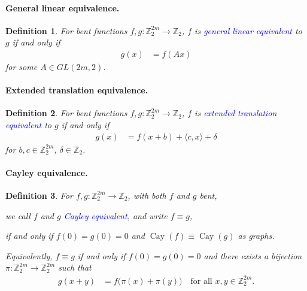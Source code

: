 \documentclass[12pt,a4paper]{article}
\newcommand{\mb}[1]{\mathbb{#1}}
\newcommand{\Z}{\mb{Z}}
\newcommand{\To}{\rightarrow}
\newcommand{\Emph}[1]{\emph{\textcolor{blue}{#1}}}
\newcommand{\Cay}[1]{\operatorname{Cay}\left(#1\right)}
\newtheorem{Definition}{Definition}
\begin{document}
\paragraph*{General linear equivalence.}

\begin{Definition}
For bent functions $f,g : \Z_2^{2m} \To \Z_2$,
$f$ is \Emph{general linear equivalent} to $g$ if and only if
\begin{align*}
g(x) &= f(A x)
\end{align*}
for some $A \in GL(2m,2)$.
\end{Definition}

\paragraph*{Extended translation equivalence.}

\begin{Definition}
For bent functions $f,g : \Z_2^{2m} \To \Z_2$,
$f$ is \Emph{extended translation equivalent} to $g$ if and only if
\begin{align*}
g(x) &= f(x + b) + \langle c, x \rangle + \delta
\end{align*}
for $b, c \in \Z_2^{2m}$, $\delta \in \Z_2$.
\end{Definition}

\paragraph*{Cayley equivalence.}
\begin{Definition}
%
For $f, g : \Z_2^{2m} \To \Z_2$, with both $f$ and $g$ bent,

we call $f$ and $g$ \Emph{Cayley equivalent},
and write $f \equiv g$,

if and only if $f(0)=g(0)=0$ and $\Cay{f} \equiv \Cay{g}$ as graphs.

Equivalently, $f \equiv g$ if and only if $f(0)=g(0)=0$ and
there exists a bijection $\pi : \Z_2^{2m} \To \Z_2^{2m}$ such that
\begin{align*}
g(x+y) &= f \big(\pi(x)+\pi(y)\big) \quad \text{for all~} x,y \in \Z_2^{2m}.
\end{align*}
\end{Definition}
\end{document}
